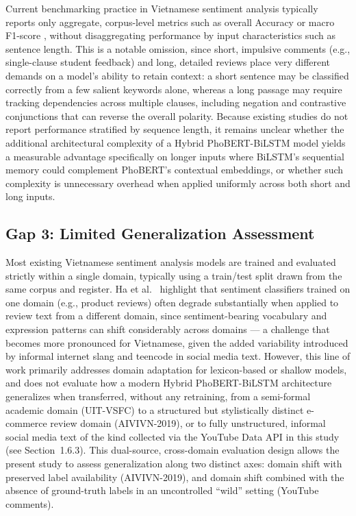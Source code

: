 \documentclass[12pt]{report} %
\begin{document}
Current benchmarking practice in Vietnamese sentiment analysis typically reports only aggregate, corpus-level metrics such as overall Accuracy or macro F1-score \cite{wankhade2022survey}, without disaggregating performance by input characteristics such as sentence length. This is a notable omission, since short, impulsive comments (e.g., single-clause student feedback) and long, detailed reviews place very different demands on a model's ability to retain context: a short sentence may be classified correctly from a few salient keywords alone, whereas a long passage may require tracking dependencies across multiple clauses, including negation and contrastive conjunctions that can reverse the overall polarity. Because existing studies do not report performance stratified by sequence length, it remains unclear whether the additional architectural complexity of a Hybrid PhoBERT-BiLSTM model yields a measurable advantage specifically on longer inputs where BiLSTM's sequential memory could complement PhoBERT's contextual embeddings, or whether such complexity is unnecessary overhead when applied uniformly across both short and long inputs.

\subsection*{Gap 3: Limited Generalization Assessment}

Most existing Vietnamese sentiment analysis models are trained and evaluated strictly within a single domain, typically using a train/test split drawn from the same corpus and register. Ha et al.\ \cite{ha2016lifelong} highlight that sentiment classifiers trained on one domain (e.g., product reviews) often degrade substantially when applied to review text from a different domain, since sentiment-bearing vocabulary and expression patterns can shift considerably across domains --- a challenge that becomes more pronounced for Vietnamese, given the added variability introduced by informal internet slang and teencode in social media text. However, this line of work primarily addresses domain adaptation for lexicon-based or shallow models, and does not evaluate how a modern Hybrid PhoBERT-BiLSTM architecture generalizes when transferred, without any retraining, from a semi-formal academic domain (UIT-VSFC) to a structured but stylistically distinct e-commerce review domain (AIVIVN-2019), or to fully unstructured, informal social media text of the kind collected via the YouTube Data API in this study (see Section~1.6.3). This dual-source, cross-domain evaluation design allows the present study to assess generalization along two distinct axes: domain shift with preserved label availability (AIVIVN-2019), and domain shift combined with the absence of ground-truth labels in an uncontrolled ``wild'' setting (YouTube comments).
\end{document}

